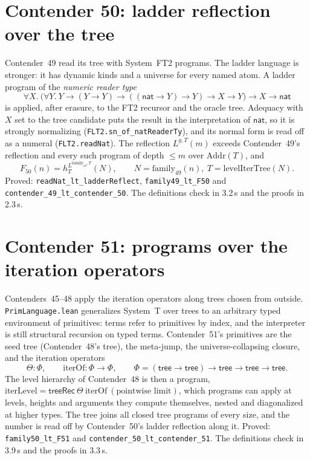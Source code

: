 \documentclass[11pt]{article}
\theoremstyle{definition}
\theoremstyle{remark}
\newcommand{\lean}[1]{\texttt{#1}}
\begin{document}
\section{Contender 50: ladder reflection over the tree}

Contender~49 read its tree with System~FT2 programs. The ladder language is
stronger: it has dynamic kinds and a universe for every named atom. A ladder
program of the \emph{numeric reader type}
\[
\forall X.\ \bigl(\forall Y.\ Y\to(Y\to Y)\to((\mathsf{nat}\to Y)\to Y)\to X\to Y\bigr)\to X\to\mathsf{nat}
\]
is applied, after erasure, to the FT2 recursor and the oracle tree. Adequacy
with $X$ set to the tree candidate puts the result in the interpretation of
$\mathsf{nat}$, so it is strongly normalizing (\lean{FLT2.sn\_of\_natReaderTy}),
and its normal form is read off as a numeral (\lean{FLT2.readNat}). The
reflection $L^{g,T}(m)$ exceeds Contender~49's reflection and every such
program of depth $\le m$ over $\mathrm{Addr}(T)$, and
\[
F_{50}(n)=h^{L^{\mathrm{family}_{49},T}}_{T}(N),\qquad N=\mathrm{family}_{49}(n),\ T=\mathrm{levelIterTree}(N).
\]
Proved: \lean{readNat\_lt\_ladderReflect}, \lean{family49\_lt\_F50} and
\lean{contender\_49\_lt\_\allowbreak contender\_50}. The definitions check in
3.2\,s and the proofs in 2.3\,s.

\section{Contender 51: programs over the iteration operators}

Contenders~45--48 apply the iteration operators along trees chosen from
outside. \lean{PrimLanguage.lean} generalizes System~T over trees to an arbitrary
typed environment of primitives: terms refer to primitives by index, and the
interpreter is still structural recursion on typed terms. Contender~51's
primitives are the seed tree (Contender~48's tree), the meta-jump, the
universe-collapsing closure, and the iteration operators
\[
\Theta:\Phi,\qquad \mathrm{iterOf}:\Phi\to\Phi,\qquad
\Phi=(\mathsf{tree}\to\mathsf{tree})\to\mathsf{tree}\to\mathsf{tree}\to\mathsf{tree}.
\]
The level hierarchy of Contender~48 is then a program,
$\mathrm{iterLevel}=\mathsf{treeRec}\ \Theta\ \mathrm{iterOf}\ (\text{pointwise limit})$,
which programs can apply at levels, heights and arguments they compute
themselves, nested and diagonalized at higher types. The tree joins all closed
tree programs of every size, and the number is read off by Contender~50's
ladder reflection along it. Proved: \lean{family50\_lt\_F51} and
\lean{contender\_50\_lt\_\allowbreak contender\_51}. The definitions check in
3.9\,s and the proofs in 3.3\,s.
\end{document}

